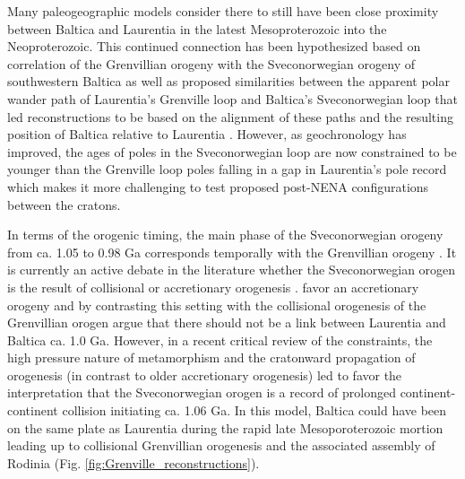 \documentclass[twocolumn, switch]{article} %
\begin{document}
Many paleogeographic models consider there to still have been close proximity between Baltica and Laurentia in the latest Mesoproterozoic into the Neoproterozoic. This continued connection has been hypothesized based on correlation of the Grenvillian orogeny with the Sveconorwegian orogeny of southwestern Baltica \citep{Gower1990b} as well as proposed similarities between the apparent polar wander path of Laurentia's Grenville loop and Baltica's Sveconorwegian loop that led reconstructions to be based on the alignment of these paths and the resulting position of Baltica relative to Laurentia \citep{Piper1980a,Pisarevsky2003a}. However, as geochronology has improved, the ages of poles in the Sveconorwegian loop are now constrained to be younger than the Grenville loop poles falling in a gap in Laurentia's pole record \citep{Evans2015a,Fairchild2017a} which makes it more challenging to test proposed post-NENA configurations between the cratons.

In terms of the orogenic timing, the main phase of the Sveconorwegian orogeny from ca. 1.05 to 0.98 Ga corresponds temporally with the Grenvillian orogeny \citep{Stephens2020a}. It is currently an active debate in the literature whether the Sveconorwegian orogen is the result of collisional or accretionary orogenesis \citep{Stephens2020a}. \cite{Slagstad2019a} favor an accretionary orogeny and by contrasting this setting with the collisional orogenesis of the Grenvillian orogen argue that there should not be a link between Laurentia and Baltica ca. 1.0 Ga. However, in a recent critical review of the constraints, the high pressure nature of metamorphism and the cratonward propagation of orogenesis (in contrast to older accretionary orogenesis) led \cite{Stephens2020a} to favor the interpretation that the Sveconorwegian orogen is a record of prolonged continent-continent collision initiating ca. 1.06 Ga. In this model, Baltica could have been on the same plate as Laurentia during the rapid late Mesoporoterozoic mortion leading up to collisional Grenvillian orogenesis and the associated assembly of Rodinia (Fig. \ref{fig:Grenville_reconstructions}).
\end{document}
